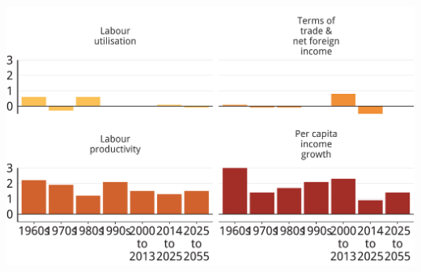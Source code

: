 \documentclass[tikz]{standalone}\usepackage[]{graphicx}\usepackage[]{color}
\newenvironment{knitrout}{}{} %
\begin{document}
\begin{knitrout}
\color{fgcolor}
\includegraphics[width=11.000in,height=7.00in]{./b5-figure/FISCAL-Figure5-alt-1} 

\end{knitrout}
\end{document}
